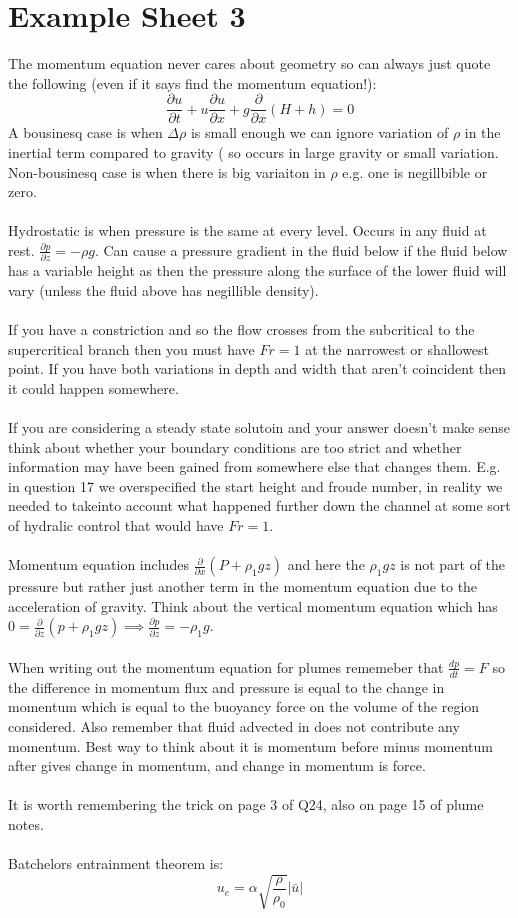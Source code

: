\documentclass{article}
\begin{document}
\section{Example Sheet 3}
The momentum equation never cares about geometry so can always just quote the following (even if it says find the momentum equation!):
$$
\frac{\partial u}{\partial t} + u \frac{\partial u}{\partial x} + g \frac{\partial }{\partial x}( H +h) = 0
$$
A bousinesq case is when $\Delta \rho$ is small enough we can ignore variation of $\rho$ in the inertial term compared to gravity ( so occurs in large gravity or small variation. Non-bousinesq case is when there is big variaiton in $\rho$ e.g. one is negillbible or zero. \\\\
Hydrostatic is when pressure is the same at every level. Occurs in any fluid at rest. $\frac{\partial p}{\partial z} = - \rho g$. Can cause a pressure gradient in the fluid below if the fluid below has a variable height as then the pressure along the surface of the lower fluid will vary (unless the fluid above has negillible density).\\\\
If you have a constriction and so the flow crosses from the subcritical to the supercritical branch then you must have $Fr =1$ at the narrowest or shallowest point. If you have both variations in depth and width that aren't coincident then it could happen somewhere.\\\\
If you are considering a steady state solutoin and your answer doesn't make sense think about whether your boundary conditions are too strict and whether information may have been gained from somewhere else that changes them. E.g. in question 17 we overspecified the start height and froude number, in reality we needed to takeinto account what happened further down the channel at some sort of hydralic control that would have $Fr =1$.\\\\
Momentum equation includes $\frac{\partial}{\partial x}( P + \rho_1 g z)$ and here the $\rho_1 g z$ is not part of the pressure but rather just another term in the momentum equation due to the acceleration of gravity. Think about the vertical momentum equation which has $0 = \frac{\partial}{\partial z} ( p + \rho_1 g z) \implies \frac{\partial p}{\partial z} = - \rho_1 g$.\\\\
When writing out the momentum equation for plumes rememeber that $\frac{d p}{dt} = F$ so the difference in momentum flux and pressure is equal to the change in momentum which is equal to the buoyancy force on the volume of the region considered. Also remember that fluid advected in does not contribute any momentum. Best way to think about it is momentum before minus momentum after gives change in momentum, and change in momentum is force.\\\\
It is worth remembering the trick on page 3 of Q24, also on page 15 of plume notes.\\\\
Batchelors entrainment theorem is:
$$
 u_e = \alpha \sqrt{\frac{\rho}{\rho_0}} |\bar u|
$$
                    
\end{document}
